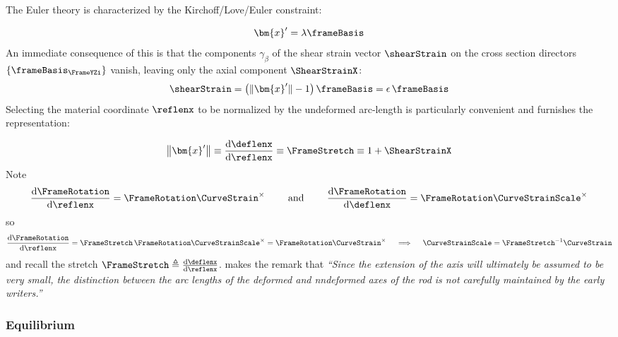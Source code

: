 
The Euler theory is characterized by the Kirchoff/Love/Euler constraint:

\begin{equation*}
\bm{x}^\prime = \lambda \frameBasis
\end{equation*}
%
An immediate consequence of this is that the components $\gamma_{\beta}$ of the shear strain vector $\shearStrain$ on the cross section directors \(\{\frameBasis_{\FrameYZi}\}\) vanish, leaving only the axial component \(\ShearStrainX\):
%
\begin{equation}
\shearStrain = \left( \|\bm{x}^{\prime}\| - 1 \right) \frameBasis = \epsilon \, \frameBasis
\end{equation}
%
Selecting the material coordinate $\reflenx$ to be normalized by the undeformed arc-length is particularly convenient
and furnishes the representation:

\begin{equation}
\left\|\bm{x}^{\prime}\right\| \equiv \frac{\mathrm{d} \deflenx}{\mathrm{d} \reflenx} \equiv \FrameStretch
\equiv 1 + \ShearStrainX
\end{equation}
%
Note 
    \begin{equation*}
    \frac{\mathrm{d} \FrameRotation}{\mathrm{d} \reflenx} = \FrameRotation \CurveStrain^{\times} 
    \qquad\text{ and }\qquad 
    \frac{\mathrm{d} \FrameRotation}{\mathrm{d} \deflenx} = \FrameRotation \CurveStrainScale^{\times} 
    \end{equation*}
  so
    \begin{equation*}
    \frac{\mathrm{d} \FrameRotation}{\mathrm{d} \reflenx} = \FrameStretch \, \FrameRotation \CurveStrainScale^{\times} = \FrameRotation \CurveStrain^{\times}
    \quad\implies\quad 
    \CurveStrainScale = \FrameStretch^{-1}\CurveStrain
    \end{equation*}
and recall the stretch \(\FrameStretch \triangleq \tfrac{\mathrm{d} \deflenx}{\mathrm{d} \reflenx}\). 
\textcite{dill1992kirchhoffs} makes the remark that \emph{``Since the extension of the axis will ultimately be assumed to be very small,
the distinction between the arc lengths of the deformed and nndeformed axes
of the rod is not carefully maintained by the early writers.''}

\subsubsection{Equilibrium}

